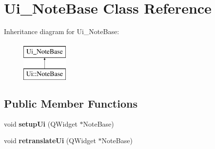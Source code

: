 \hypertarget{class_ui___note_base}{}\section{Ui\+\_\+\+Note\+Base Class Reference}
\label{class_ui___note_base}
Inheritance diagram for Ui\+\_\+\+Note\+Base\+:\begin{figure}[H]
\begin{center}
\leavevmode
\includegraphics[height=2.000000cm]{class_ui___note_base}
\end{center}
\end{figure}
\subsection*{Public Member Functions}
\begin{DoxyCompactItemize}
\item 
\mbox{\label{class_ui___note_base_af29cd93d2c5a4b96bcd7401f2555f85e}} 
void {\bfseries setup\+Ui} (Q\+Widget $\ast$Note\+Base)
\item 
\mbox{\label{class_ui___note_base_a6a0ac5edbca054ff5663d5edb00c8bac}} 
void {\bfseries retranslate\+Ui} (Q\+Widget $\ast$Note\+Base)
\end{DoxyCompactItemize}
